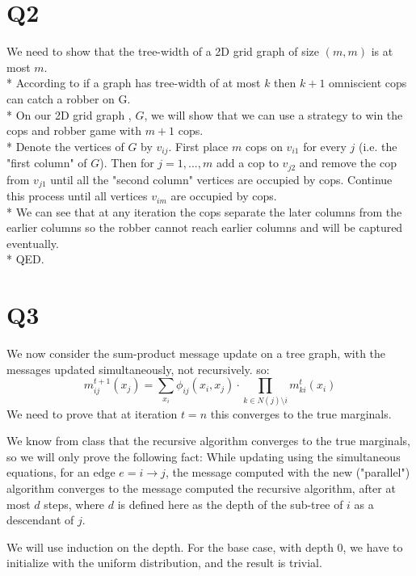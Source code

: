 \documentclass[11pt]{article}
\begin{document}
\part*{Q2}
We need to show that the tree-width of a 2D grid graph of size $(m,m)$ is at most $m$. \\*
According to \cite{SEYMOUR199322} if a graph has tree-width of at most $k$ then $k+1$ omniscient cops can catch a robber on G. \\*
On our 2D grid graph , $G$, we will show that we can use a strategy to win the cops and robber game with $m+1$ cops. \\*
Denote the vertices of $G$ by $v_{ij}$. First place $m$ cops on $v_{i1}$ for every $j$ (i.e. the "first column" of $G$). Then for $j=1,...,m$ add a cop to $v_{j2}$ and remove the cop from $v_{j1}$ until all the "second column" vertices are occupied by cops. Continue this process until all vertices $v_{im}$ are occupied by cops. \\*
We can see that at any iteration the cops separate the later columns from the earlier columns so the robber cannot reach earlier columns and will be captured eventually. \\*
QED. 

\part*{Q3}
We now consider the sum-product message update on a tree graph, with the messages updated simultaneously, not recursively. so:
\begin{equation}\label{eq:q3_update}
m_{ij}^{t+1}\left(x_j\right) = \sum_{x_i} \phi_{ij}\left(x_i, x_j\right) \cdot \prod_{k\in N\left(j\right)\setminus i} m_{ki}^t\left(x_i\right)
\end{equation}
We need to prove that at iteration $t=n$ this converges to the true marginals.

We know from class that the recursive algorithm converges to the true marginals, so we will only prove the following fact:
While updating using the simultaneous equations, for an edge $e= i\rightarrow j$, the message computed with the new ("parallel") algorithm converges to the message computed the recursive algorithm, after at most $d$ steps, where $d$ is defined here as the depth of the sub-tree of $i$ as a descendant of $j$.

We will use induction on the depth.
For the base case, with depth $0$, we have to initialize with the uniform distribution, and the result is trivial.
\end{document}
